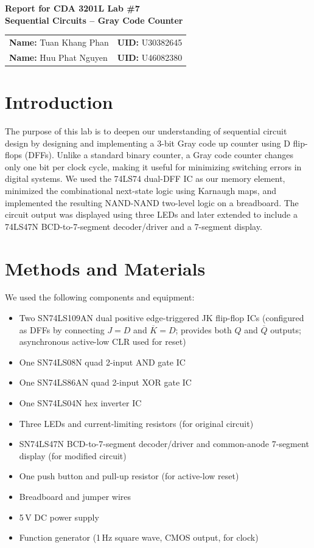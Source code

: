 \documentclass[12pt, letterpaper]{article}
\begin{document}
\begin{center}
  {\Large \textbf{Report for CDA 3201L Lab \#7}}\\[10pt]
  {\large \textbf{Sequential Circuits -- Gray Code Counter}}\\[20pt]
  \begin{tabular}{ll}
    \textbf{Name:} Tuan Khang Phan & \textbf{UID:} U30382645 \\[4pt]
    \textbf{Name:} Huu Phat Nguyen & \textbf{UID:} U46082380 \\
  \end{tabular}
\end{center}

\section{Introduction}

The purpose of this lab is to deepen our understanding of sequential circuit design by
designing and implementing a 3-bit Gray code up counter using D flip-flops (DFFs).
Unlike a standard binary counter, a Gray code counter changes only one bit per clock
cycle, making it useful for minimizing switching errors in digital systems.  We used the
74LS74 dual-DFF IC as our memory element, minimized the combinational next-state logic
using Karnaugh maps, and implemented the resulting NAND-NAND two-level logic on a
breadboard.  The circuit output was displayed using three LEDs and later extended to
include a 74LS47N BCD-to-7-segment decoder/driver and a 7-segment display.

\section{Methods and Materials}

We used the following components and equipment:

\begin{itemize}
  \item Two SN74LS109AN dual positive edge-triggered JK flip-flop ICs (configured as
        DFFs by connecting $J = D$ and $\overline{K} = D$; provides both $Q$ and
        $\overline{Q}$ outputs; asynchronous active-low CLR used for reset)
  \item One SN74LS08N quad 2-input AND gate IC
  \item One SN74LS86AN quad 2-input XOR gate IC
  \item One SN74LS04N hex inverter IC
  \item Three LEDs and current-limiting resistors (for original circuit)
  \item SN74LS47N BCD-to-7-segment decoder/driver and common-anode 7-segment display
        (for modified circuit)
  \item One push button and pull-up resistor (for active-low reset)
  \item Breadboard and jumper wires
  \item 5\,V DC power supply
  \item Function generator (1\,Hz square wave, CMOS output, for clock)
\end{itemize}
\end{document}
